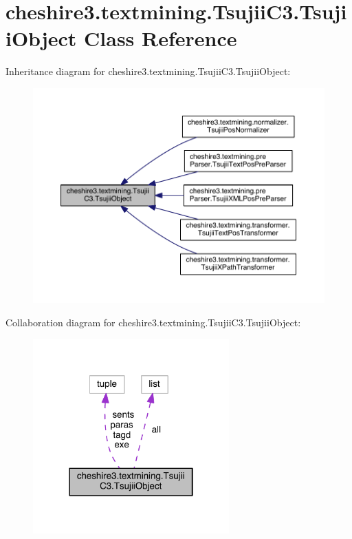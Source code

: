 \hypertarget{classcheshire3_1_1textmining_1_1_tsujii_c3_1_1_tsujii_object}{\section{cheshire3.\-textmining.\-Tsujii\-C3.\-Tsujii\-Object Class Reference}
\label{classcheshire3_1_1textmining_1_1_tsujii_c3_1_1_tsujii_object}
}


Inheritance diagram for cheshire3.\-textmining.\-Tsujii\-C3.\-Tsujii\-Object\-:
\nopagebreak
\begin{figure}[H]
\begin{center}
\leavevmode
\includegraphics[width=350pt]{classcheshire3_1_1textmining_1_1_tsujii_c3_1_1_tsujii_object__inherit__graph}
\end{center}
\end{figure}


Collaboration diagram for cheshire3.\-textmining.\-Tsujii\-C3.\-Tsujii\-Object\-:
\nopagebreak
\begin{figure}[H]
\begin{center}
\leavevmode
\includegraphics[width=214pt]{classcheshire3_1_1textmining_1_1_tsujii_c3_1_1_tsujii_object__coll__graph}
\end{center}
\end{figure}
